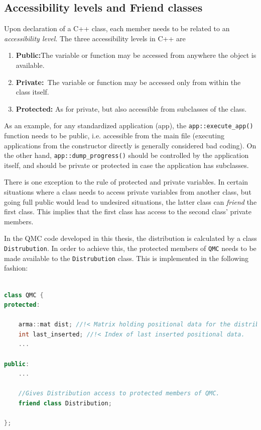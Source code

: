 \subsection{Accessibility levels and Friend classes}

Upon declaration of a C++ class, each member needs to be related to an \textit{accessibility level}. The three accessibility levels in C++ are 

\begin{enumerate}[label=\textbf{(\roman{*})}, ref=(\roman{*}), align=left]
 \item \textbf{Public:}\qquad The variable or function may be accessed from anywhere the object is available.
 \item \textbf{Private:}\quad\, The variable or function may be accessed only from within the class itself. 
 \item \textbf{Protected:} As for private, but also accessible from subclasses of the class.
 \label{enum:accessibilityLevels}
 \vspace{0.3cm}
\end{enumerate}

As an example, for any standardized application (app), the \verb+app::execute_app()+ function needs to be public, i.e. accessible from the main file (executing applications from the constructor directly is generally considered bad coding). On the other hand, \verb+app::dump_progress()+ should be controlled by the application itself, and should be private or protected in case the application has subclasses.

There is one exception to the rule of protected and private variables. In certain situations where a class needs to access private variables from another class, but going full public would lead to undesired situations, the latter class can \textit{friend} the first class. This implies that the first class has access to the second class' private members.

In the QMC code developed in this thesis, the distribution is calculated by a class \verb+Distrubution+. In order to achieve this, the protected members of \verb+QMC+ needs to be made available to the \verb+Distrubution+ class. This is implemented in the following fashion:

\clearpage
\begin{lstlisting}[language=c++]

class QMC {
protected:
    
    arma::mat dist; //!< Matrix holding positional data for the distribution.
    int last_inserted; //!< Index of last inserted positional data.
    ...

public:
    ...

    //Gives Distribution access to protected members of QMC.
    friend class Distribution;

};
\end{lstlisting}

